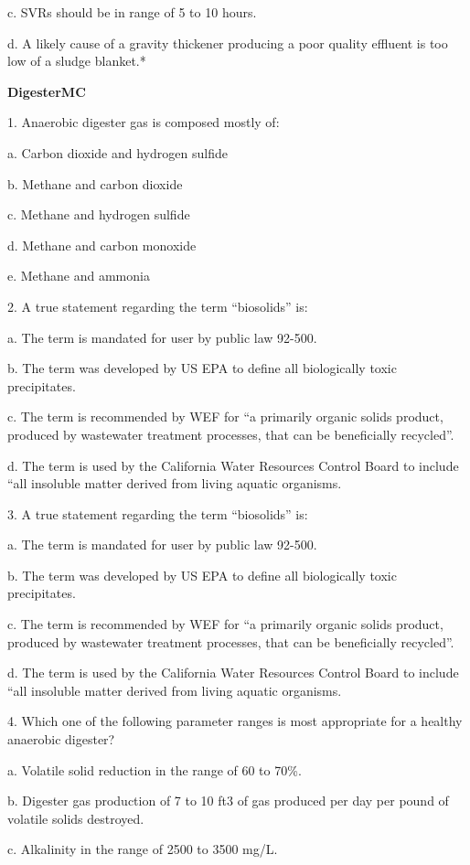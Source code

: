 \documentclass{article}
\begin{document}
c. SVRs should be in range of 5 to 10 hours. 

d. A likely cause of a gravity thickener producing a poor quality effluent is too low of a sludge blanket.* 

\textbf{DigesterMC}

1. Anaerobic digester gas is composed mostly of:

a. Carbon dioxide and hydrogen sulfide 

b. Methane and carbon dioxide 

c. Methane and hydrogen sulfide 

d. Methane and carbon monoxide 

e. Methane and ammonia 


2. A true statement regarding the term “biosolids” is:

a. The term is mandated for user by public law 92-500. 

b. The term was developed by US EPA to define all biologically toxic precipitates. 

c. The term is recommended by WEF for “a primarily organic solids product, produced by wastewater treatment processes, that can be beneficially recycled”. 

d. The term is used by the California Water Resources Control Board to include “all insoluble matter derived from living aquatic organisms. 


3. A true statement regarding the term “biosolids” is:

a. The term is mandated for user by public law 92-500. 

b. The term was developed by US EPA to define all biologically toxic precipitates. 

c. The term is recommended by WEF for “a primarily organic solids product, produced by wastewater treatment processes, that can be beneficially recycled”. 

d. The term is used by the California Water Resources Control Board to include “all insoluble matter derived from living aquatic organisms. 


4. Which one of the following parameter ranges is most appropriate for a healthy anaerobic digester? 

a. Volatile solid reduction in the range of 60 to 70\%. 

b. Digester gas production of 7 to 10 ft3 of gas produced per day per pound of volatile solids destroyed. 

c. Alkalinity in the range of 2500 to 3500 mg/L. 
\end{document}
